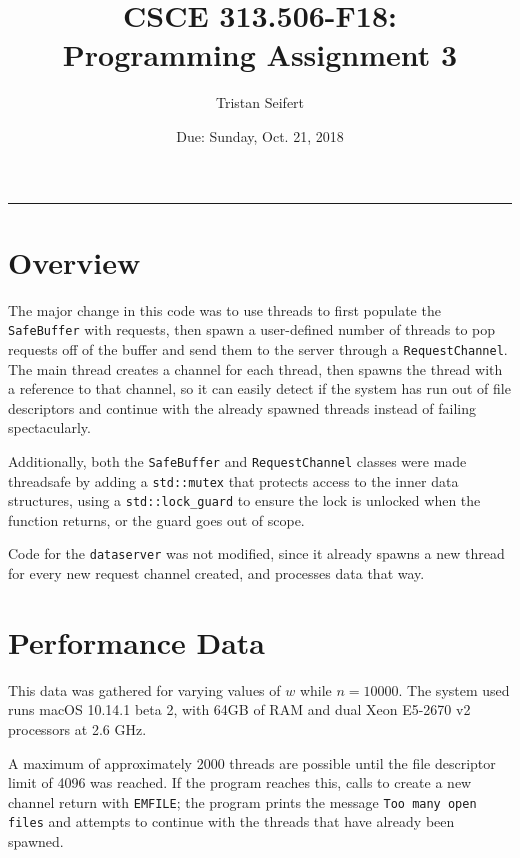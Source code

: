 \documentclass[10pt]{article}
\title{CSCE 313.506-F18: \\Programming Assignment 3}
\author{Tristan Seifert}
\date{Due: Sunday, Oct. 21, 2018}
\begin{document}
\maketitle

\hrule

\section{Overview}
The major change in this code was to use threads to first populate the \texttt{SafeBuffer} with requests, then spawn a user-defined number of threads to pop requests off of the buffer and send them to the server through a \texttt{RequestChannel}. The main thread creates a channel for each thread, then spawns the thread with a reference to that channel, so it can easily detect if the system has run out of file descriptors and continue with the already spawned threads instead of failing spectacularly.

Additionally, both the \texttt{SafeBuffer} and \texttt{RequestChannel} classes were made threadsafe by adding a \texttt{std::mutex} that protects access to the inner data structures, using a \texttt{std::lock_guard} to ensure the lock is unlocked when the function returns, or the guard goes out of scope.

Code for the \texttt{dataserver} was not modified, since it already spawns a new thread for every new request channel created, and processes data that way.

\section{Performance Data}
This data was gathered for varying values of $w$ while $n = 10000$. The system used runs macOS 10.14.1 beta 2, with 64GB of RAM and dual Xeon E5-2670 v2 processors at 2.6 GHz.

A maximum of approximately 2000 threads are possible until the file descriptor limit of 4096 was reached. If the program reaches this, calls to create a new channel return with \texttt{EMFILE}; the program prints the message \texttt{Too many open files} and attempts to continue with the threads that have already been spawned.
\end{document}
